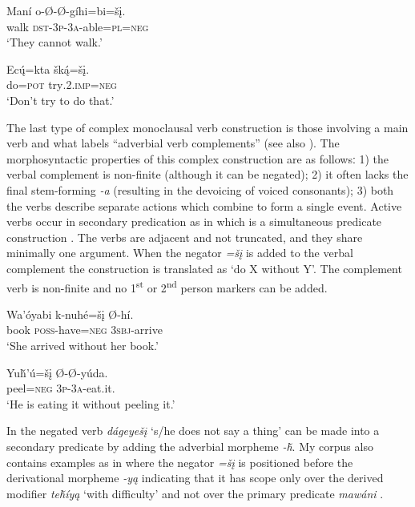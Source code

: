 \documentclass[output=paper,colorlinks,citecolor=brown]{langscibook}
\begin{document}
\ea\label{ex:nak:9}
    \gll Maní o-Ø-Ø-gíhi=bi=šį. \\
         walk \textsc{dst}-\textsc{3p-3a}-able=\textsc{pl=neg} \\
    \glt ‘They cannot walk.’
\z 

\ea\label{ex:nak:10}
    \gll Ec\'{ų}=kta šk\'{ą}=šį. \\
         do=\textsc{pot} try\textsc{.2.imp=neg} \\
    \glt ‘Don’t try to do that.’
\z 

The last type of complex monoclausal verb construction is those involving a main verb and what \citet[406]{Cumberland2005} labels “adverbial verb complements” (see also \citealt[122--125]{Ullrich2018}). The morphosyntactic properties of this complex construction are as followsː 1) the verbal complement is non-finite (although it can be negated); 2) it often lacks the final stem-forming \textit{-a} (resulting in the devoicing of voiced consonants); 3) both the verbs describe separate actions which combine to form a single event. Active verbs occur in secondary predication as in  which is a simultaneous predicate construction \citep[273--274]{Ullrich2018}. The verbs are adjacent and not truncated, and they share minimally one argument. When the negator \textit{=šį} is added to the verbal complement the construction is translated as ‘do X without Y’. The complement verb is non-finite and no 1\textsuperscript{st} or 2\textsuperscript{nd} person markers can be added.

\ea\label{ex:nak:11}
    \ea\label{ex:nak:11a}
        \gll Wa’óyabi k-nuhé=šį Ø-hí. \\
             book \textsc{poss}-have=\textsc{neg} \textsc{3sbj}-arrive \\
        \glt ‘She arrived without her book.’
    
    \ex\label{ex:nak:11b}
        \gll Yuȟ’ú=šį Ø-Ø-yúda. \\
             peel=\textsc{neg} \textsc{3p-3a}-eat.it. \\
        \glt ‘He is eating it without peeling it.’
    \z
\z 

In  the negated verb \textit{dágeyešį} ‘s/he does not say a thing’ can be made into a secondary predicate by adding the adverbial morpheme \textit{-ȟ}. My corpus also contains examples as in  where the negator \textit{=šį} is positioned before the derivational morpheme \textit{-yą} indicating that it has scope only over the derived modifier \textit{teȟíyą} ‘with difficulty’ and not over the primary predicate \textit{mawáni} .
\end{document}
